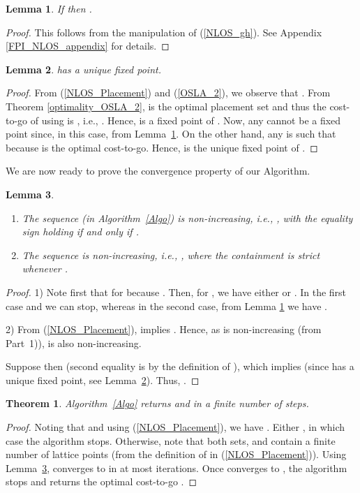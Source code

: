 \documentclass[conference]{IEEEtran}
\newtheorem{theorem}{Theorem}
\newtheorem{lemma}{Lemma}
\begin{document}
\begin{lemma} \label{FPI_NLOS}
If  then .
\end{lemma}
\begin{proof}
This follows from the manipulation of (\ref{NLOS_gh}). See Appendix \ref{FPI_NLOS_appendix} 
for details.
\end{proof}
\begin{lemma} \label{uniqueFP_NLOS}
  has a unique fixed point.
\end{lemma}
\begin{proof}
From (\ref{NLOS_Placement}) and (\ref{OSLA_2}), we observe that 
. 
From Theorem \ref{optimality_OSLA_2},  is the optimal 
placement set and thus the cost-to-go of using  is , 
i.e., . Hence,  is a fixed 
point of . Now, any  cannot be a fixed point since, in this case,  
from Lemma~\ref{FPI_NLOS}. On the other hand, any  is such that  because 
 is the optimal cost-to-go. Hence,  is the unique fixed point of . 
\end{proof}

We are now ready to prove the convergence property of our Algorithm.


\begin{lemma}\label{hk_nonincreasing_NLOS}
\begin{enumerate}
\item The sequence  (in Algorithm~\ref{Algo}) is non-increasing,
i.e., , with the equality sign holding if and only if .
\item The sequence  is non-increasing, i.e., , where the containment is strict whenever .
\end{enumerate}
\end{lemma}
\begin{proof}
1) Note first that  for  because . Then, for , we have either  or  . In the first case  and we can stop, whereas in the second case, from Lemma \ref{FPI_NLOS} we have  . 

2) From (\ref{NLOS_Placement}),  implies . 
Hence, as  is non-increasing (from Part~1)), 
 is also non-increasing. 

Suppose  then 
(second equality is by the definition of ), which implies  (since  has a unique fixed point, see Lemma~\ref{uniqueFP_NLOS}). Thus, .
\end{proof}

\begin{theorem}
Algorithm~\ref{Algo} returns  and  in a finite number of steps. 
\end{theorem}
\begin{proof}
Noting that  and using (\ref{NLOS_Placement}), we have 
. Either , in which case the algorithm stops. Otherwise, note that both sets,  and  contain a finite number of lattice points (from the definition of  in (\ref{NLOS_Placement})). Using Lemma~\ref{hk_nonincreasing_NLOS},  converges to  in at most  iterations. Once  converges to , the algorithm stops and returns the optimal cost-to-go .
\end{proof}
\end{document}
